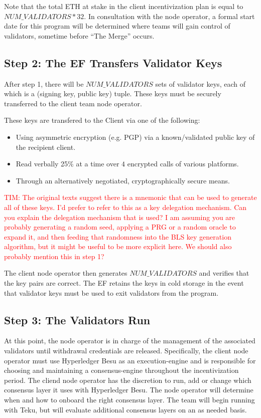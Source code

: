 Note that the total ETH at stake in the client incentivization plan is equal to $NUM\_VALIDATORS * 32$. In consultation with the node operator, a formal start date for this program will be determined where teams will gain control of validators, sometime before ``The Merge'' occurs.

\subsection{Step 2:  The EF Transfers Validator Keys}
After step 1, there will be $NUM\_VALIDATORS$ sets of validator keys, each of which is a (signing key, public key) tuple. These keys must be securely transferred to the client team node operator.

These keys are transfered to the Client via one of the following:
\begin{itemize}
\item Using asymmetric encryption (e.g. PGP) via a known/validated public key of the recipient client.
\item Read verbally 25\% at a time over $4$ encrypted calls of various platforms.
\item Through an alternatively negotiated, cryptographically secure means.
\end{itemize}

\textcolor{red}{TIM:  The original texts suggest there is a mnemonic that can be used to generate all of these keys.  I'd prefer to refer to this as a key delegation mechanism.  Can you explain the delegation mechanism that is used?  I am assuming you are probably generating a random seed, applying a PRG or a random oracle to expand it, and then feeding that randomness into the BLS key generation algorithm, but it might be useful to be more explicit here.  We should also probably mention this in step 1?}

The client node operator then generates $NUM\_VALIDATORS$ and verifies that the key pairs are correct. The EF retains the keys in cold storage in the event that validator keys must be used to exit validators from the program.


\subsection{Step 3:  The Validators Run}
At this point, the node operator is in charge of the management of the associated validators until withdrawal credentials are released. Specifically, the client node operator must use Hyperledger Besu as an execution-engine and is responsible for choosing and maintaining a consensus-engine throughout the incentivization period.  The cliend node operator has the discretion to run, add or change which consensus layer it uses with Hyperledger Besu. The node operator will determine when and how to onboard the right consensus layer. The team will begin running with Teku, but will evaluate additional consensus layers on an as needed basis.

